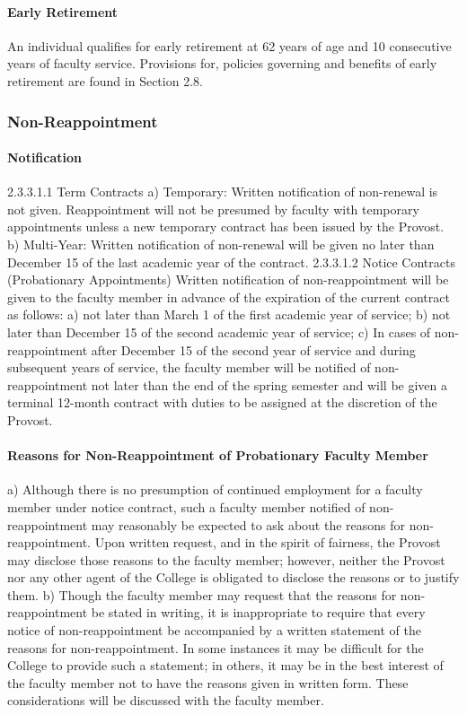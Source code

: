\documentclass[letterpaper, 11pt]{article}
\begin{document}
			\paragraph{Early Retirement}
				An individual qualifies for early retirement at 62 years of age and 10 consecutive years of faculty service.  Provisions for, policies governing and benefits of early retirement are found in Section 2.8.
		\subsubsection{Non-Reappointment}
			\paragraph{Notification}
				2.3.3.1.1 Term Contracts
				a) Temporary: Written notification of non-renewal is not given.  Reappointment will not be presumed by faculty with temporary appointments unless a new temporary contract has been issued by the Provost.
				b) Multi-Year: Written notification of non-renewal will be given no later than December 15 of the last academic year of the contract.
				2.3.3.1.2 Notice Contracts (Probationary Appointments)
				Written notification of non-reappointment will be given to the faculty member in advance of the expiration of the current contract as follows:
				a) not later than March 1 of the first academic year of service;
				b) not later than December 15 of the second academic year of service;
				c) In cases of non-reappointment after December 15 of the second year of service and during subsequent years of service, the faculty member will be notified of non-reappointment not later than the end of the spring semester and will be given a terminal 12-month contract with duties to be assigned at the discretion of the Provost.
			\paragraph{Reasons for Non-Reappointment of Probationary Faculty Member}
				a) Although there is no presumption of continued employment for a faculty member under notice contract, such a faculty member notified of non-reappointment may reasonably be expected to ask about the reasons for non-reappointment.  Upon written request, and in the spirit of fairness, the Provost may disclose those reasons to the faculty member; however, neither the Provost nor any other agent of the College is obligated to disclose the reasons or to justify them.
				b) Though the faculty member may request that the reasons for non-reappointment be stated in writing, it is inappropriate to require that every notice of non-reappointment be accompanied by a written statement of the reasons for non-reappointment.  In some instances it may be difficult for the College to provide such a statement; in others, it may be in the best interest of the faculty member not to have the reasons given in written form.  These considerations will be discussed with the faculty member.
\end{document}
